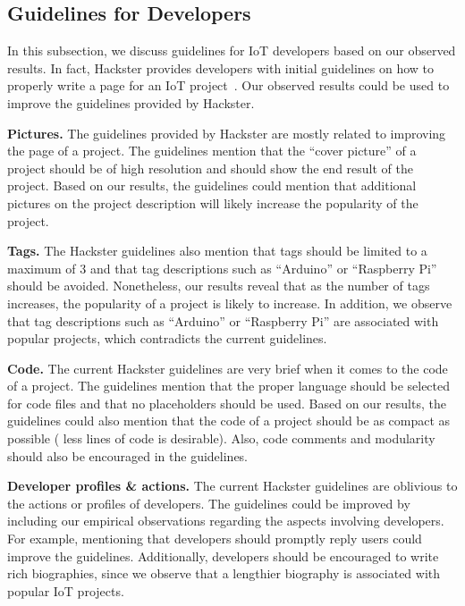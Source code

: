 \subsection{Guidelines for Developers}\label{sec:guidelines}
\begin{comment}
\end{comment}

In this subsection, we discuss guidelines for IoT developers based on our
observed results. In fact, Hackster provides developers with initial guidelines
on how to properly write a page for an IoT project~\cite{guidelines}. Our
observed results could be used to improve the guidelines provided by Hackster.

{\bfseries Pictures.} The guidelines provided by Hackster are mostly related to
improving the page of a project. The guidelines mention that the ``cover
picture'' of a project should be of high resolution and should show the end
result of the project.  Based on our results, the guidelines could mention that
additional pictures on the project description will likely increase the
popularity of the project. 

{\bfseries Tags.} The Hackster guidelines also mention that tags should be
limited to a maximum of 3 and that tag descriptions such as ``Arduino'' or
``Raspberry Pi'' should be avoided. Nonetheless, our results reveal that as the
number of tags increases, the popularity of a project is likely to increase.
In addition, we observe that tag descriptions such as ``Arduino'' or
``Raspberry Pi'' are associated with popular projects, which contradicts the
current guidelines.

{\bfseries Code.} The current Hackster guidelines are very brief when it comes
to the code of a project. The guidelines mention that the proper language
should be selected for code files and that no placeholders should be used.
Based on our results, the guidelines could also mention that the code of a
project should be as compact as possible (\ie{} less lines of code is
desirable). Also, code comments and modularity should also be encouraged in the
guidelines.

{\bfseries Developer profiles \& actions.} The current Hackster guidelines are
oblivious to the actions or profiles of developers. The guidelines could be
improved by including our empirical observations regarding the aspects involving
developers. For example, mentioning that developers should promptly reply users
could improve the guidelines. Additionally, developers should be encouraged to
write rich biographies, since we observe that a lengthier biography is
associated with popular IoT projects.



